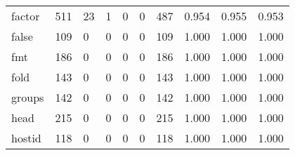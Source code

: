 \begin{longtable}{lp{1.3cm}p{1.3cm}p{1.3cm}p{1.3cm}p{1.3cm}p{1.3cm}p{1.3cm}p{1.3cm}p{1.3cm}}
factor    &                    511 &                                 23 &                                 1 &                                0 &                                 0 &                             487 &                                   0.954 &                                  0.955 &                                0.953 \\
false     &                    109 &                                  0 &                                 0 &                                0 &                                 0 &                             109 &                                   1.000 &                                  1.000 &                                1.000 \\
fmt       &                    186 &                                  0 &                                 0 &                                0 &                                 0 &                             186 &                                   1.000 &                                  1.000 &                                1.000 \\
fold      &                    143 &                                  0 &                                 0 &                                0 &                                 0 &                             143 &                                   1.000 &                                  1.000 &                                1.000 \\
groups    &                    142 &                                  0 &                                 0 &                                0 &                                 0 &                             142 &                                   1.000 &                                  1.000 &                                1.000 \\
head      &                    215 &                                  0 &                                 0 &                                0 &                                 0 &                             215 &                                   1.000 &                                  1.000 &                                1.000 \\
hostid    &                    118 &                                  0 &                                 0 &                                0 &                                 0 &                             118 &                                   1.000 &                                  1.000 &                                1.000 \\

\end{longtable}
